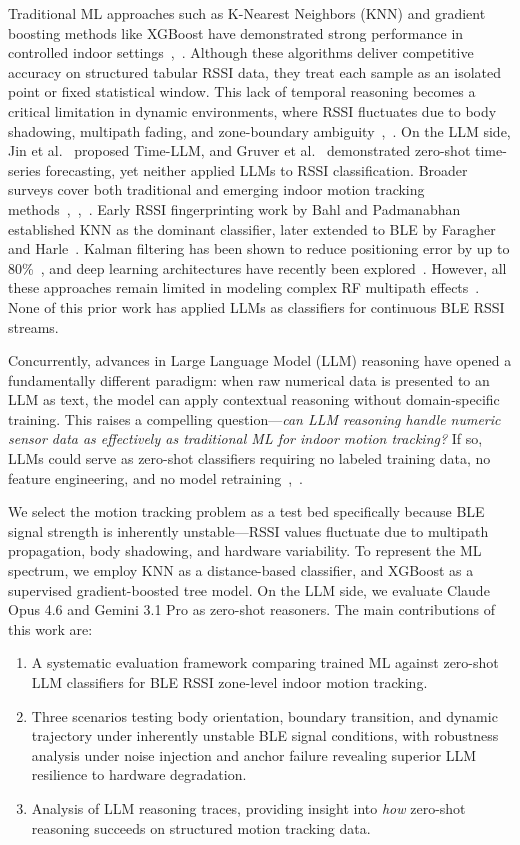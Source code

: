 \documentclass[conference]{IEEEtran}
\begin{document}
Traditional ML approaches such as K-Nearest Neighbors (KNN) and gradient boosting methods like XGBoost have demonstrated strong performance in controlled indoor settings~\cite{b3},~\cite{b4}. Although these algorithms deliver competitive accuracy on structured tabular RSSI data, they treat each sample as an isolated point or fixed statistical window. This lack of temporal reasoning becomes a critical limitation in dynamic environments, where RSSI fluctuates due to body shadowing, multipath fading, and zone-boundary ambiguity~\cite{b5},~\cite{b6}. On the LLM side, Jin et al.~\cite{b7} proposed Time-LLM, and Gruver et al.~\cite{b8} demonstrated zero-shot time-series forecasting, yet neither applied LLMs to RSSI classification. Broader surveys cover both traditional and emerging indoor motion tracking methods~\cite{b1},~\cite{b2},~\cite{b9}. Early RSSI fingerprinting work by Bahl and Padmanabhan~\cite{b10} established KNN as the dominant classifier, later extended to BLE by Faragher and Harle~\cite{b11}. Kalman filtering has been shown to reduce positioning error by up to 80\%~\cite{b12}, and deep learning architectures have recently been explored~\cite{b13}. However, all these approaches remain limited in modeling complex RF multipath effects~\cite{b14}. None of this prior work has applied LLMs as classifiers for continuous BLE RSSI streams.

Concurrently, advances in Large Language Model (LLM) reasoning have opened a fundamentally different paradigm: when raw numerical data is presented to an LLM as text, the model can apply contextual reasoning without domain-specific training. This raises a compelling question---\textit{can LLM reasoning handle numeric sensor data as effectively as traditional ML for indoor motion tracking?} If so, LLMs could serve as zero-shot classifiers requiring no labeled training data, no feature engineering, and no model retraining~\cite{b7},~\cite{b8}.

We select the motion tracking problem as a test bed specifically because BLE signal strength is inherently unstable---RSSI values fluctuate due to multipath propagation, body shadowing, and hardware variability. To represent the ML spectrum, we employ KNN as a distance-based classifier, and XGBoost as a supervised gradient-boosted tree model. On the LLM side, we evaluate Claude Opus 4.6 and Gemini 3.1 Pro as zero-shot reasoners. The main contributions of this work are:
\begin{enumerate}
    \item A systematic evaluation framework comparing trained ML against zero-shot LLM classifiers for BLE RSSI zone-level indoor motion tracking.
    \item Three scenarios testing body orientation, boundary transition, and dynamic trajectory under inherently unstable BLE signal conditions, with robustness analysis under noise injection and anchor failure revealing superior LLM resilience to hardware degradation.
    \item Analysis of LLM reasoning traces, providing insight into \textit{how} zero-shot reasoning succeeds on structured motion tracking data.
\end{enumerate}
\end{document}
